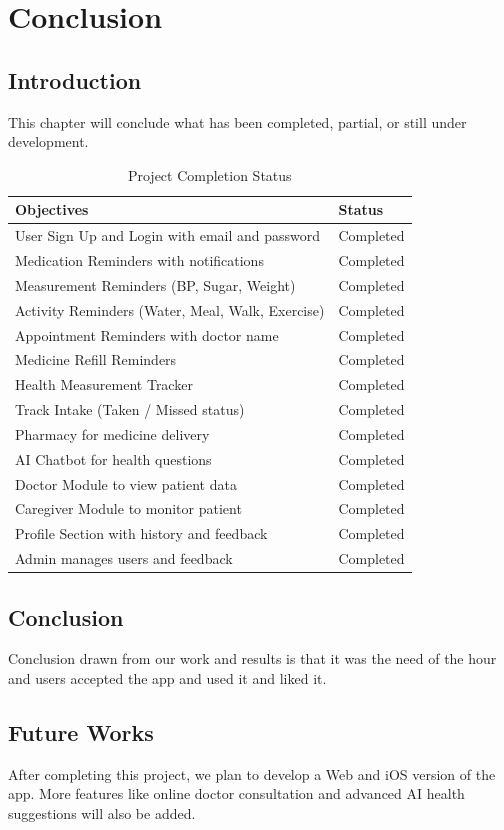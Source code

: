 \chapter{Conclusion}
\label{ch:conclusion}

\section{Introduction}
This chapter will conclude what has been completed, partial, or still under development.

\begin{table}[H]
\centering
\caption{Project Completion Status}
\begin{tabularx}{\textwidth}{|X|l|}
\hline
\textbf{Objectives} & \textbf{Status} \\ \hline
User Sign Up and Login with email and password & Completed \\ \hline
Medication Reminders with notifications & Completed \\ \hline
Measurement Reminders (BP, Sugar, Weight) & Completed \\ \hline
Activity Reminders (Water, Meal, Walk, Exercise) & Completed \\ \hline
Appointment Reminders with doctor name & Completed \\ \hline
Medicine Refill Reminders & Completed \\ \hline
Health Measurement Tracker & Completed \\ \hline
Track Intake (Taken / Missed status) & Completed \\ \hline
Pharmacy for medicine delivery & Completed \\ \hline
AI Chatbot for health questions & Completed \\ \hline
Doctor Module to view patient data & Completed \\ \hline
Caregiver Module to monitor patient & Completed \\ \hline
Profile Section with history and feedback & Completed \\ \hline
Admin manages users and feedback & Completed \\ \hline
\end{tabularx}
\end{table}

\section{Conclusion}
Conclusion drawn from our work and results is that it was the need of the hour and users accepted the app and used it and liked it.

\section{Future Works}
After completing this project, we plan to develop a Web and iOS version of the app. More features like online doctor consultation and advanced AI health suggestions will also be added.
